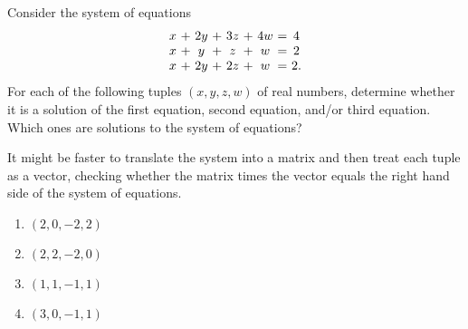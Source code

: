 \documentclass{ximera}
\author{Zack Reed}
\begin{document}
\begin{problem}

    Consider the system of equations
    \begin{equation*}
      \begin{array}{c@{~}c@{~}c@{~}c@{~}c@{~}c@{~}c@{~}c@{~}c}
        x&+&2y&+&3z&+&4w &=& 4 \\
        x&+&y&+&z&+&w &=& 2 \\
        x&+&2y&+&2z&+&w &=& 2.
      \end{array}
    \end{equation*}
    For each of the following tuples $(x,y,z,w)$ of real numbers,
    determine whether it is a solution of the first equation, second
    equation, and/or third equation. Which ones are solutions to the
    system of equations?
  
    \begin{hint}
  
      It might be faster to translate the system into a matrix and then treat each tuple as a vector, checking whether the matrix times the vector equals the right hand side of the system of equations.
  
    \end{hint}
  
    \begin{enumerate}
        \item $(2,0,-2,2)$
        \begin{selectAll}
        \end{selectAll}
      
        \item $(2,2,-2,0)$
        \begin{selectAll}
        \end{selectAll}
      
        \item $(1,1,-1,1)$
        \begin{selectAll}
        \end{selectAll}
      
        \item $(3,0,-1,1)$
        \begin{selectAll}
        \end{selectAll}
      

\end{enumerate}
\end{problem}
\end{document}
